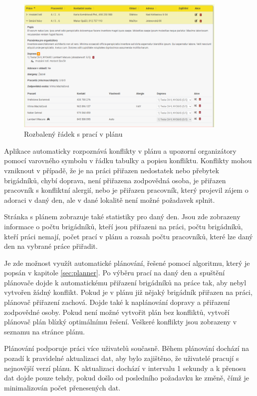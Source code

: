\begin{figure}[h]
    \centering
    \includegraphics[width=0.9\textwidth]{chapters/images/plan-expanded.pdf}
    \caption{Rozbalený řádek s prací v plánu}
    \label{fig:plan-expanded}
\end{figure}


Aplikace automaticky rozpoznává konflikty v plánu a upozorní organizátory pomocí varovného symbolu v řádku tabulky a popisu konfliktu.
Konflikty mohou vzniknout v případě, že je na práci přiřazen nedostatek nebo přebytek brigádníků, 
chybí doprava, není přiřazena zodpovědná osoba, je přiřazen pracovník s konfliktní alergií, nebo je přiřazen pracovník, který projevil zájem o adoraci v daný den,
ale v dané lokalitě není možné požadavek splnit.

Stránka s plánem zobrazuje také statistiky pro daný den. Jsou zde zobrazeny informace o počtu brigádníků, kteří jsou přiřazeni na práci, počtu brigádníků, kteří
práci nemají, počet prací v plánu a rozsah počtu pracovníků, které lze daný den na vybrané práce přiřadit.

Je zde možnost využít automatické plánování, řešené pomocí algoritmu, který je popsán v kapitole \ref{sec:planner}. Po výběru prací na daný den a spuštění
plánovače dojde k automatickému přiřazení brigádníků na práce tak, aby nebyl vytvořen žádný konflikt. Pokud je v plánu již nějaký brigádník přiřazen na práci, 
plánovač přiřazení zachová. Dojde také k naplánování dopravy a přiřazení zodpovědné osoby. Pokud není možné vytvořit plán bez konfliktů, 
vytvoří plánovač plán blízký optimálnímu řešení. Veškeré konflikty jsou zobrazeny v seznamu na stránce plánu.

Plánování podporuje práci více uživatelů současně. Během plánování dochází na pozadí k pravidelné aktualizaci dat, aby bylo zajištěno,
že uživatelé pracují s nejnovější verzí plánu. K aktualizaci dochází v intervalu 1 sekundy a k přenosu dat dojde pouze tehdy, pokud došlo od posledního požadavku ke změně,
čímž je minimalizován počet přenesených dat.

